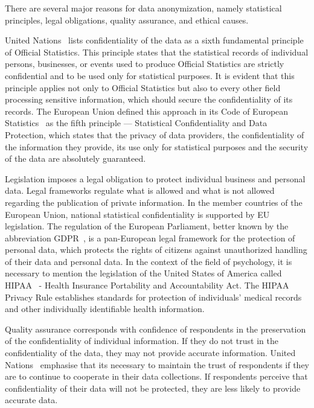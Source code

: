 \documentclass{article}
\begin{document}
There are several major reasons for data anonymization, namely statistical principles, legal obligations, quality assurance, and ethical causes. 

United Nations~\cite{2015_UN} lists confidentiality of the data as a sixth fundamental principle of Official Statistics. This principle states that the statistical records of individual persons, businesses, or events used to produce Official Statistics are strictly confidential and to be used only for statistical purposes. It is evident that this principle applies not only to Official Statistics but also to every other field processing sensitive information, which should secure the confidentiality of its records. The European Union defined this approach in its Code of European Statistics~\cite{2018_Eurostat} as the fifth principle — Statistical Confidentiality and Data Protection, which states that the privacy of data providers, the confidentiality of the information they provide, its use only for statistical purposes and the security of the data are absolutely guaranteed.

Legislation imposes a legal obligation to protect individual business and personal data. Legal frameworks regulate what is allowed and what is not allowed regarding the publication of private information. In the member countries of the European Union, national statistical confidentiality is supported by EU legislation. The regulation of the European Parliament, better known by the abbreviation GDPR~\cite{2016_EU_2016/679}, is a pan-European legal framework for the protection of personal data, which protects the rights of citizens against unauthorized handling of their data and personal data.
In the context of the field of psychology, it is necessary to mention the legislation of the United States of America called HIPAA~\cite{1996_HIPAA} - Health Insurance Portability and Accountability Act.
The HIPAA Privacy Rule establishes standards for protection of individuals' medical records and other individually identifiable health information.

Quality assurance corresponds with confidence of respondents in the preservation of the confidentiality of individual information. If they do not trust in the confidentiality of the data, they may not provide accurate information. United Nations~\cite{2007_UN} emphasise that its necessary to maintain the trust of respondents if they are to continue to cooperate in their data collections. If respondents perceive that confidentiality of their data will not be protected, they are less likely to provide accurate data. 
\end{document}
